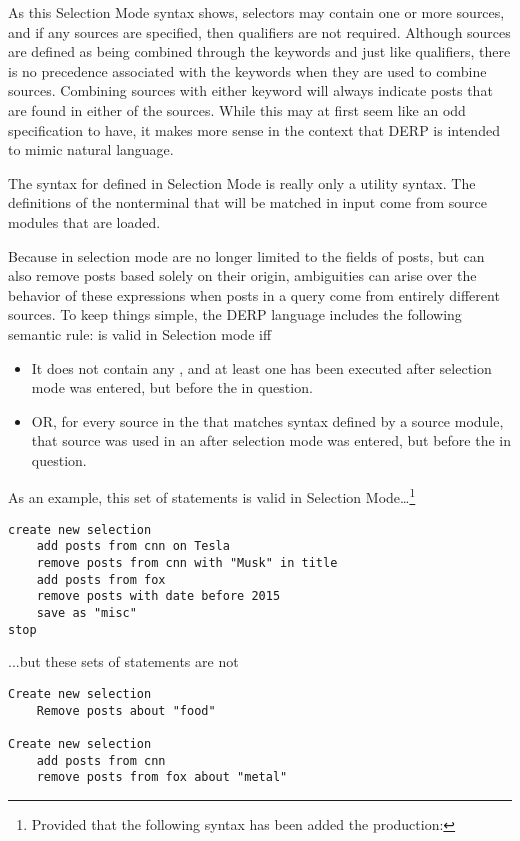 As this Selection Mode syntax shows, selectors may contain one or more sources, and if any sources are specified, then qualifiers are not required. Although
sources are defined as being combined through the keywords  and  just like qualifiers, there is no precedence associated with the keywords when they
are used to combine sources. Combining sources with either keyword will always indicate posts that are found in either of the sources. While this may at
first seem like an odd specification to have, it makes more sense in the context that DERP is intended to mimic natural language.

The syntax for  defined in Selection Mode is really only a utility syntax. The definitions of the nonterminal that will be matched in input come
from source modules that are loaded.

Because  in selection mode are no longer limited to the fields of posts, but can also remove posts based solely on their origin, ambiguities
can arise over the behavior of these expressions when posts in a query come from entirely different sources. To keep things simple, the DERP language includes
the following semantic rule:  is valid in Selection mode iff
\begin{itemize}
\item It does not contain any , and at least one  has been executed after selection mode was entered, but before the  in question.
\item OR, for every source in the  that matches syntax defined by a source module, that source was used in an  after selection mode was entered, but before the  in question.
\end{itemize}
As an example, this set of statements is valid in Selection Mode…\footnote{Provided that the following syntax has been added the production: \hspace{.25in}  \bnf{:}  \bnf{|} }
\newline\begin{minipage}{\linewidth}\begin{lstlisting}
create new selection
    add posts from cnn on Tesla
    remove posts from cnn with "Musk" in title
    add posts from fox
    remove posts with date before 2015
    save as "misc"
stop
\end{lstlisting}\end{minipage}
...but these sets of statements are not
\newline\begin{minipage}{\linewidth}\begin{lstlisting}
Create new selection
    Remove posts about "food"

Create new selection
    add posts from cnn
    remove posts from fox about "metal"
\end{lstlisting}\end{minipage}
